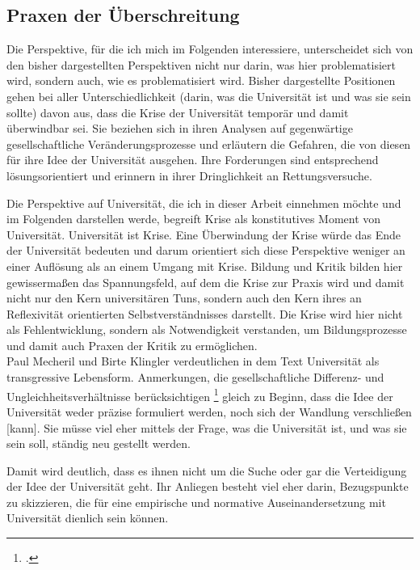 \subsection{Praxen der Überschreitung}

Die Perspektive, für die ich mich im Folgenden interessiere, unterscheidet sich
von den bisher dargestellten Perspektiven nicht nur darin, was hier
problematisiert wird, sondern auch, wie es problematisiert wird. Bisher
dargestellte Positionen gehen bei aller Unterschiedlichkeit (darin, was die
Universität ist und was sie sein sollte) davon aus, dass die Krise der
Universität temporär und damit überwindbar sei. Sie beziehen sich in ihren
Analysen auf gegenwärtige gesellschaftliche Veränderungsprozesse und erläutern
die Gefahren, die von diesen für ihre Idee der Universität ausgehen. Ihre
Forderungen sind entsprechend lösungsorientiert und erinnern in ihrer
Dringlichkeit an Rettungsversuche.

Die Perspektive auf Universität, die ich in
dieser Arbeit einnehmen möchte und im Folgenden darstellen werde, begreift Krise als konstitutives Moment von
Universität. Universität ist Krise. Eine Überwindung der Krise würde das Ende
der Universität bedeuten und darum orientiert sich diese Perspektive weniger an
einer Auflösung als an einem Umgang mit Krise. Bildung und Kritik bilden hier
gewissermaßen das Spannungsfeld, auf dem die Krise zur Praxis wird und damit
nicht nur den Kern universitären Tuns, sondern auch den Kern ihres an
Reflexivität orientierten Selbstverständnisses darstellt. Die Krise wird hier
nicht als Fehlentwicklung, sondern als Notwendigkeit verstanden, um
Bildungsprozesse und damit auch Praxen der Kritik zu ermöglichen.
\\

Paul Mecheril und Birte Klingler verdeutlichen in dem Text \glqq Universität als
transgressive Lebensform. Anmerkungen, die gesellschaftliche Differenz- und
Ungleichheitsverhältnisse berücksichtigen\grqq\footnotemark
\footcitetext{metcheril} gleich zu Beginn, dass \glqq die Idee
der Universität weder präzise formuliert werden, noch sich der Wandlung
verschließen [kann].\grqq\footnotemark {} Sie müsse viel eher mittels der Frage, was die
Universität ist, und was sie sein soll, ständig neu gestellt werden.

Damit wird deutlich, dass es ihnen nicht um die Suche oder gar die Verteidigung der
Idee der Universität geht. Ihr Anliegen besteht viel eher darin, Bezugspunkte
zu skizzieren, die für eine empirische und normative Auseinandersetzung mit
Universität dienlich sein können.

